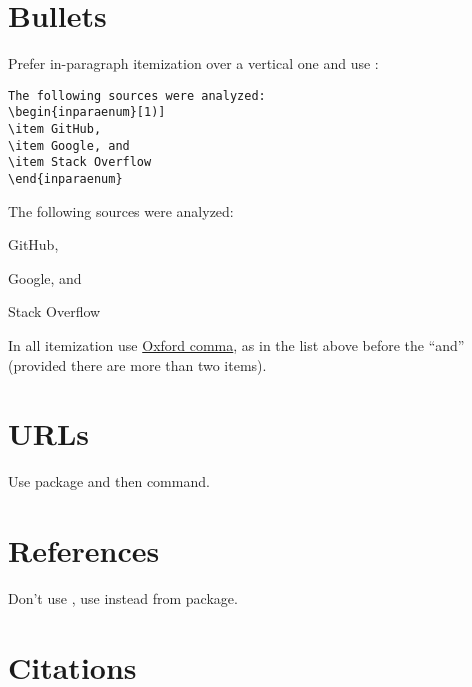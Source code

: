 \documentclass[12pt,nonacm,natbib=false]{acmart}
\begin{document}
\section{Bullets}

Prefer in-paragraph itemization over a vertical one and use \href{https://ctan.org/pkg/paralist}{}:

\begin{multicols}{2}
\setlength{\parskip}{0pt}
\small
\raggedcolumns
\begin{verbatim}
The following sources were analyzed:
\begin{inparaenum}[1)]
\item GitHub,
\item Google, and
\item Stack Overflow
\end{inparaenum}
\end{verbatim}

\columnbreak

\raggedright
The following sources were
analyzed:
\begin{inparaenum}[1)]
\item GitHub,
\item Google, and
\item Stack Overflow
\end{inparaenum}
\end{multicols}

In all itemization use \href{https://en.wikipedia.org/wiki/Serial_comma}{Oxford comma}, as in the list above before the ``and'' (provided there are more than two items).

\section{URLs}

Use \href{https://ctan.org/pkg/href-ul}{} package and then  command.

\section{References}

Don't use , use  instead from \href{https://ctan.org/pkg/cleveref}{} package.

\section{Citations}
\end{document}
